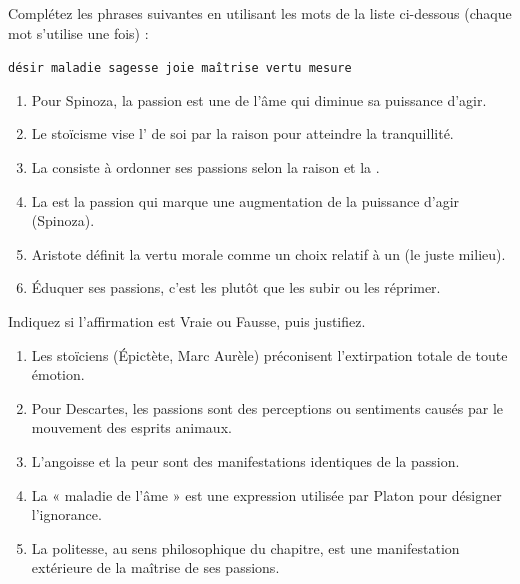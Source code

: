\documentclass[11pt]{article}
\begin{document}
\begin{exercice}
Complétez les phrases suivantes en utilisant les mots de la liste ci-dessous (chaque mot s'utilise une fois) :
\begin{center}
\texttt{désir \quad maladie \quad sagesse \quad joie \quad maîtrise \quad vertu \quad mesure}
\end{center}
\begin{enumerate}
    \item Pour Spinoza, la passion est une \underline{\hspace{4cm}} de l'âme qui diminue sa puissance d'agir.
    \item Le stoïcisme vise l'\underline{\hspace{4cm}} de soi par la raison pour atteindre la tranquillité.
    \item La \underline{\hspace{4cm}} consiste à ordonner ses passions selon la raison et la \underline{\hspace{4cm}}.
    \item La \underline{\hspace{4cm}} est la passion qui marque une augmentation de la puissance d'agir (Spinoza).
    \item Aristote définit la vertu morale comme un choix relatif à un \underline{\hspace{4cm}} (le juste milieu).
    \item Éduquer ses passions, c'est les \underline{\hspace{4cm}} plutôt que les subir ou les réprimer.
\end{enumerate}
\end{exercice}

\begin{exercice}
Indiquez si l'affirmation est Vraie ou Fausse, puis justifiez.
\begin{enumerate}
    \item Les stoïciens (Épictète, Marc Aurèle) préconisent l'extirpation totale de toute émotion.
    \item Pour Descartes, les passions sont des perceptions ou sentiments causés par le mouvement des esprits animaux.
    \item L'angoisse et la peur sont des manifestations identiques de la passion.
    \item La « maladie de l'âme » est une expression utilisée par Platon pour désigner l'ignorance.
    \item La politesse, au sens philosophique du chapitre, est une manifestation extérieure de la maîtrise de ses passions.
\end{enumerate}
\end{exercice}
\end{document}

